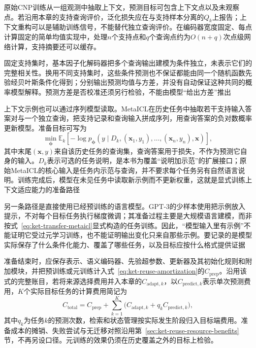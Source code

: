原始CNP训练从一组观测中抽取上下文，预测目标可包含上下文点以及未观察点。若沿用本章的支持查询评价，泛化损失应在与支持样本分离的$Q_k$上报告；上下文重构可以是辅助训练信号，不能替代独立查询评价。在编码器宽度固定、每点计算固定的简单均值实现中，处理$n$个支持点和$q$个查询点约为$O(n+q)$次点级网络计算，支持摘要还可以缓存。

固定支持集时，基本因子化解码器把多个查询输出建模为条件独立，未表示它们的完整相关性。换用不同支持集时，这些条件预测也不保证都能由同一个随机函数先验经贝叶斯条件化得到；分别输出预测均值与方差，并没有自动保证这种共同的概率模型解释。预测方差是否校准还须另行检验，不能由模型“给出方差”推出

上下文示例也可以通过序列模型读取。MetaICL在历史任务中抽取若干支持输入答案对与一个独立查询，把支持记录和查询输入拼成序列，用查询答案的负对数概率更新模型。准备目标可写为
\begin{equation}
  \min_{\bm\phi}
  \mathbb E_k\left[
    -\log p_{\bm\phi}
       (y\mid D_k,(\bm x_1,y_1),\ldots,(\bm x_n,y_n),\bm x)
  \right],
  \label{eq:ket-transfer-metaicl}
\end{equation}
其中末尾$(\bm x,y)$来自该历史任务的查询集，查询答案用于损失，不作为预测它自身的输入。$D_k$表示可选的任务说明，是本书为覆盖“说明加示范”的扩展接口；原始MetaICL的核心输入是任务内示范与查询，并不要求每个任务另有自然语言说明。训练完成后，模型在未见任务中读取新示例而不更新权重，这就是显式训练上下文适应能力的准备路径

另一条路径是直接使用已经预训练的语言模型。GPT-3的少样本使用把示例放入提示，不对每个目标任务执行梯度微调；其准备过程主要是大规模语言建模，而非按式~\eqref{eq:ket-transfer-metaicl}显式构造的任务训练。因此，“模型输入里有示例”不能证明它受过元学习训练，也不能证明输出变化只来自那些示例。要记录的是模型实际保存了什么条件化能力、覆盖了哪些任务，以及目标应按什么格式提供证据

准备结束时，应保存表示、语义编码器、先验超参数、更新器及其初始化规则和附加模块，并把预训练或元训练计入式~\eqref{eq:ket-reuse-amortization}的$C_{\mathrm{prep}}$。沿用该式的完整账目，若将来源选择费用并入本章的$C_{\mathrm{adapt},k}$，以$C_{\mathrm{predict},k}$表示单次预测费用，$K$个实际目标任务的计算费用简记为
\begin{equation}
  C_{\mathrm{total}}
    =C_{\mathrm{prep}}
     +\sum_{k=1}^{K}
       \bigl(C_{\mathrm{adapt},k}+q_kC_{\mathrm{predict},k}\bigr),
  \label{eq:ket-transfer-total-cost}
\end{equation}
其中$q_k$为任务$k$的预测次数，检索和状态管理按实际发生阶段归入目标端费用。准备成本的摊销、失败尝试与无迁移对照沿用第~\ref{sec:ket-reuse-resource-benefits}节，不再另设口径。元训练的效果仍须在历史覆盖之外的目标上检验。

